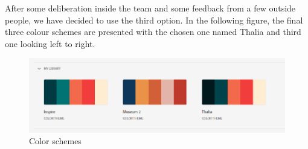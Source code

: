 \documentclass[main.tex]{subfiles}
\begin{document}
After some deliberation inside the team and some feedback from a few outside people, we have decided to use the third option.      
In the following figure, the final three colour schemes are presented with the chosen one named Thalia and third one looking left to right.

\begin{figure}[H]
    \caption{Color schemes \cite{TR}}
    \includegraphics[width=\textwidth]{03Branding/Pictures/color_schemes.png}
\end{figure}
\end{document}
